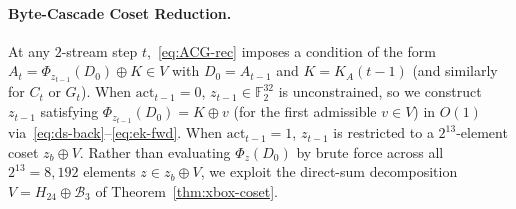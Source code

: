 \documentclass[11pt,a4paper]{article}
\theoremstyle{definition}
\theoremstyle{remark}
\newcommand{\Ftwo}{\mathbb{F}_2}
\begin{document}
\paragraph{Byte-Cascade Coset Reduction.}
At any $2$-stream step $t$,~\eqref{eq:ACG-rec} imposes a condition of the form $A_t = \Phi_{z_{t-1}}(D_0) \oplus K \in V$ with $D_0 = A_{t-1}$ and $K = K_A(t-1)$ (and similarly for $C_t$ or $G_t$). When $\mathrm{act}_{t-1} = 0$, $z_{t-1} \in \Ftwo^{32}$ is unconstrained, so we construct $z_{t-1}$ satisfying $\Phi_{z_{t-1}}(D_0) = K \oplus v$ (for the first admissible $v \in V$) in $O(1)$ via~\eqref{eq:ds-back}--\eqref{eq:ek-fwd}. When $\mathrm{act}_{t-1} = 1$, $z_{t-1}$ is restricted to a $2^{13}$-element coset $z_b \oplus V$. Rather than evaluating $\Phi_z(D_0)$ by brute force across all $2^{13} = 8{,}192$ elements $z \in z_b \oplus V$, we exploit the direct-sum decomposition $V = H_{24} \oplus \mathcal{B}_3$ of Theorem~\ref{thm:xbox-coset}.
\end{document}
